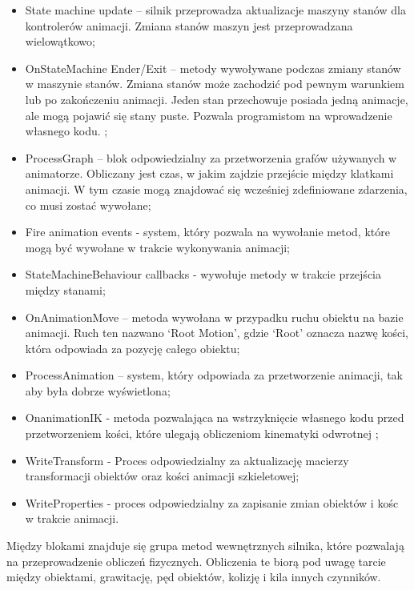 \documentclass[12pt,twoside]{article}
\begin{document}
\begin{itemize}
\item State machine update – silnik przeprowadza aktualizacje maszyny stanów dla
kontrolerów animacji. Zmiana stanów maszyn jest przeprowadzana wielowątkowo; 
\item OnStateMachine Ender/Exit – metody wywoływane podczas zmiany stanów\\w
maszynie stanów. Zmiana stanów może zachodzić pod pewnym warunkiem lub po
zakończeniu animacji. Jeden stan przechowuje posiada jedną animacje, ale mogą
pojawić się stany puste. Pozwala programistom na wprowadzenie własnego kodu.
\cite{Unity:StateChangeEnter,Unity:StateChangeExit};
\item ProcessGraph – blok odpowiedzialny za przetworzenia grafów używanych w
animatorze. Obliczany jest czas, w jakim zajdzie przejście między klatkami
animacji. W tym czasie mogą znajdować się wcześniej zdefiniowane zdarzenia, co
musi zostać wywołane;
\item Fire animation events - system, który pozwala na wywołanie metod, które
mogą być wywołane w trakcie wykonywania animacji; 
\item StateMachineBehaviour callbacks - wywołuje metody w trakcie
przejścia między stanami;
\item OnAnimationMove – metoda wywołana w przypadku ruchu obiektu na bazie
animacji. Ruch ten nazwano ‘Root Motion’, gdzie ‘Root’ oznacza nazwę kości,
która odpowiada za pozycję całego obiektu;  
\item ProcessAnimation – system, który odpowiada za przetworzenie animacji, tak
aby była dobrze wyświetlona;
\item OnanimationIK - metoda pozwalająca na wstrzyknięcie własnego kodu przed
przetworzeniem kości, które ulegają obliczeniom kinematyki odwrotnej \cite{Unity:ONAnimationIK};  
\item WriteTransform - Proces odpowiedzialny za aktualizację macierzy
transformacji obiektów oraz kości animacji szkieletowej;
\item WriteProperties - proces odpowiedzialny za zapisanie zmian obiektów i
kośc\\w trakcie animacji.  
\end{itemize}
Między blokami znajduje się grupa metod wewnętrznych silnika, które pozwalają na
przeprowadzenie obliczeń fizycznych. Obliczenia te biorą pod uwagę tarcie między
obiektami, grawitację, pęd obiektów, kolizję i kila innych czynników.   
\end{document}
